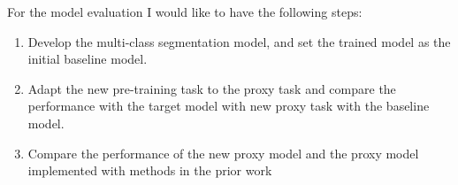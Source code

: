 For the model evaluation I would like to have the following steps:
\begin{enumerate}
    \item Develop the multi-class segmentation model, and set the trained model as the initial baseline model.
    \item Adapt the new pre-training task to the proxy task and compare the performance with the target model with new proxy task with the baseline model.
    \item Compare the performance of the new proxy model and the proxy model implemented with methods in the prior work
\end{enumerate}